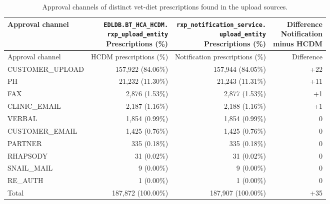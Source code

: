 \begin{longtable}{@{}lrrr@{}}
\caption{Approval channels of distinct vet-diet prescriptions found in the upload sources.}
\label{tab:upload-vet-diet-approval-channels}\\
\toprule
Approval channel & \shortstack{\texttt{EDLDB.BT\_HCA\_HCDM.}\\\texttt{rxp\_upload\_entity}\\Prescriptions (\%)} & \shortstack{\texttt{rxp\_notification\_service.}\\\texttt{upload\_entity}\\Prescriptions (\%)} & \shortstack{Difference\\Notification\\minus HCDM} \\
\midrule
\endfirsthead
\toprule Approval channel & HCDM prescriptions (\%) & Notification prescriptions (\%) & Difference \\
\midrule
\endhead

{CUSTOMER\_UPLOAD} & 157,922 (84.06\%) & 157,944 (84.05\%) & +22 \\

{PH} & 21,232 (11.30\%) & 21,243 (11.31\%) & +11 \\

{FAX} & 2,876 (1.53\%) & 2,877 (1.53\%) & +1 \\

{CLINIC\_EMAIL} & 2,187 (1.16\%) & 2,188 (1.16\%) & +1 \\

{VERBAL} & 1,854 (0.99\%) & 1,854 (0.99\%) & 0 \\

{CUSTOMER\_EMAIL} & 1,425 (0.76\%) & 1,425 (0.76\%) & 0 \\

{PARTNER} & 335 (0.18\%) & 335 (0.18\%) & 0 \\

{RHAPSODY} & 31 (0.02\%) & 31 (0.02\%) & 0 \\

{SNAIL\_MAIL} & 9 (0.00\%) & 9 (0.00\%) & 0 \\

{RE\_AUTH} & 1 (0.00\%) & 1 (0.00\%) & 0 \\
\midrule
{Total} & 187,872 (100.00\%) & 187,907 (100.00\%) & +35 \\
\bottomrule
\end{longtable}